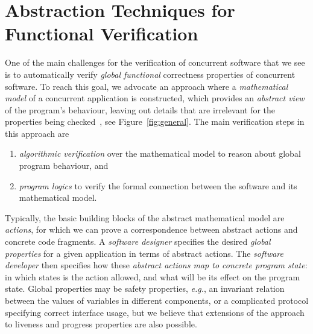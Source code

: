 \section{Abstraction Techniques for Functional Verification}\label{sec:model}

One of the main challenges for the verification of concurrent software that we see is 
to automatically verify \emph{global functional} correctness properties of concurrent software. 
To reach this goal, we advocate an approach where a \emph{mathematical model} of a concurrent application is constructed, which provides an \emph{abstract view} of the program's behaviour, leaving out  details that are irrelevant for the properties being checked~\cite{BlomHZ15,OortwijnBGHZ17}, see Figure~\ref{fig:general}. The main verification steps in this approach are
\begin{enumerate}[topsep=0pt,noitemsep]
\item \emph{algorithmic verification} over the mathematical model to reason about global program behaviour, and 
\item \emph{program logics} to verify  the formal connection between the software and its mathematical model.
\end{enumerate} 

\begin{figure*}[t]
\begin{center}
\end{center}
\caption{Using abstraction for the verification of concurrent and distributed software}\label{fig:general}
\end{figure*}


Typically, the basic building blocks of the abstract mathematical model are \emph{actions}, for which we can prove a correspondence between abstract actions and concrete code fragments.
A \emph{software designer} specifies the desired \emph{global properties} for a given application in terms of abstract actions. The \emph{software developer} then specifies how these \emph{abstract actions map to concrete program state}: in which states is the action allowed, and what will be its effect on the program state. Global properties may be safety properties, \emph{e.g.}, an invariant relation between the values of variables in different components, or a complicated protocol specifying correct interface usage, but we believe that extensions of the approach to liveness and progress properties are also possible. 

